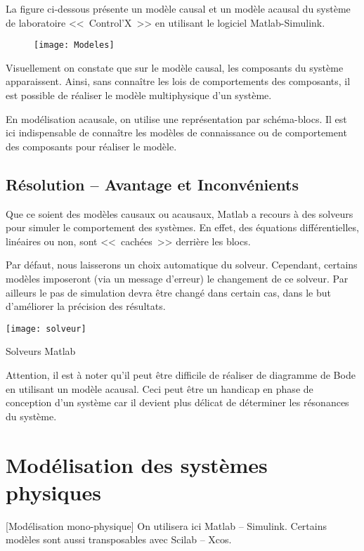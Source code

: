 La figure ci-dessous présente un modèle causal et un modèle acausal du système de laboratoire <<~Control'X~>> en utilisant le logiciel Matlab-Simulink.

\begin{figure*}[!h]
\texttt{[image: Modeles]}
\end{figure*}

Visuellement on constate que sur le modèle causal, les composants du système apparaissent. Ainsi, sans connaître les lois de comportements des composants, il est possible de réaliser le modèle multiphysique d'un système.

En modélisation acausale, on utilise une représentation par schéma-blocs. Il est ici indispensable de connaître les modèles de connaissance ou de comportement des composants pour réaliser le modèle.

\subsection{Résolution -- Avantage et Inconvénients}

Que ce soient des modèles causaux ou acausaux, Matlab a recours à des solveurs pour simuler le comportement des systèmes. En effet, des équations différentielles, linéaires ou non, sont <<~cachées~>> derrière les blocs.  

Par défaut, nous laisserons un choix automatique du solveur. Cependant, certains modèles imposeront (via un message d'erreur) le changement de ce solveur. Par ailleurs le pas de simulation devra être changé dans certain cas, dans le but d'améliorer la précision des résultats.

\begin{marginfigure}[-2cm]
\texttt{[image: solveur]}
\caption{Solveurs Matlab}
\end{marginfigure}


\begin{warn}
Attention, il est à noter qu'il peut être difficile de réaliser de diagramme de Bode en utilisant un modèle acausal. Ceci peut être un handicap en phase de conception d'un système car il devient plus délicat de déterminer les résonances du système.
\end{warn}
\section{Modélisation des systèmes physiques}[Modélisation mono-physique]
On utilisera ici Matlab -- Simulink. Certains modèles sont aussi transposables avec Scilab -- Xcos. 

